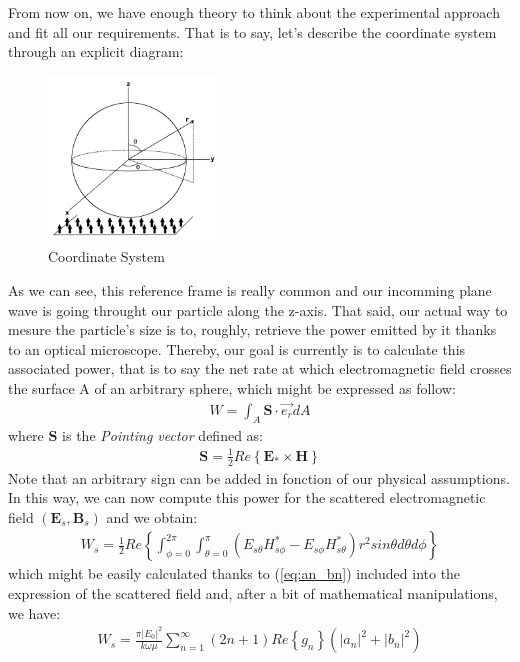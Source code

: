 \documentclass{article}
\numberwithin{equation}{section}
\begin{document}
From now on, we have enough theory to think about the experimental approach and fit all our requirements. That is to say, let's describe the coordinate system through an explicit diagram:
\begin{figure}[h]
    \centering
    \includegraphics[width=0.4\textwidth, height=0.4\textwidth]{system.png}
    \caption{Coordinate System}
    \label{fig:system}
\end{figure}
As we can see, this reference frame is really common and our incomming plane wave is going throught our particle along the z-axis. That said, our actual way to mesure the particle's size is to, roughly, retrieve the power emitted by it thanks to an optical microscope. Thereby, our goal is currently is to calculate this associated power, that is to say the net rate at which electromagnetic field crosses the surface A of an arbitrary sphere, which might be expressed as follow:
\begin{align}
W=\int_{A}^{}\textbf{S}\cdot \overrightarrow{e_{r}}dA
\end{align}
where $\textbf{S}$ is the \textit{Pointing vector} defined as:
\begin{align}
\textbf{S} = \frac{1}{2}Re\left\{\textbf{E}_{*} \times \textbf{H}\right\}
\end{align}
Note that an arbitrary sign can be added in fonction of our physical assumptions. In this way, we can now compute this power for the scattered electromagnetic field $(\textbf{E}_{s}, \textbf{B}_{s})$ and we obtain:
\begin{align}\label{eq:w_s}
W_{s}=\frac{1}{2}Re\left\{ \int_{\phi=0}^{2\pi}\int_{\theta=0}^{\pi} (E_{s\theta}H^{*}_{s\phi} - E_{s\phi}H^{*}_{s\theta})r^{2}sin\theta d\theta d\phi\right\}
\end{align}
which might be easily calculated thanks to (\ref{eq:an_bn}) included into the expression of the scattered field and, after a bit of mathematical manipulations, we have:
\begin{align}
W_{s}=\frac{\pi\left| E_{0} \right|^{2}}{k\omega\mu}\sum_{n=1}^{\infty }(2n+1)Re\left\{ g_{n} \right\}(\left| a_{n} \right|^{2}+\left| b_{n} \right|^{2})
\end{align}
\end{document}
